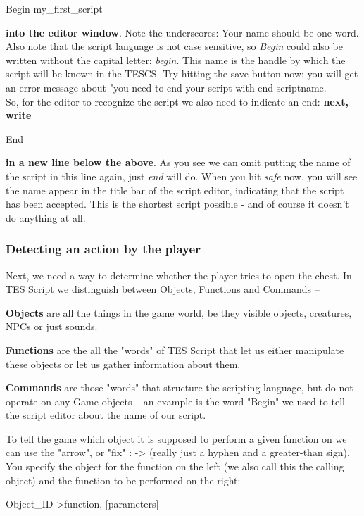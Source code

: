 \documentclass[
]{article}
\begin{document}
Begin my\_first\_script

\textbf{into the editor window}. Note the underscores: Your name should
be one word. Also note that the script language is not case sensitive,
so \emph{Begin} could also be written without the capital letter:
\emph{begin}. This name is the handle by which the script will be known
in the TESCS. Try hitting the save button now: you will get an error
message about "you need to end your script with end scriptname.\\
So, for the editor to recognize the script we also need to indicate an
end: \textbf{next, write}

End

\textbf{in a new line below the above}. As you see we can omit putting
the name of the script in this line again, just \emph{end} will do. When
you hit \emph{safe} now, you will see the name appear in the title bar
of the script editor, indicating that the script has been accepted. This
is the shortest script possible - and of course it doesn't do anything
at all.

\hypertarget{detecting-an-action-by-the-player}{%
\subsubsection{Detecting an action by the
player}\label{detecting-an-action-by-the-player}}

Next, we need a way to determine whether the player tries to open the
chest. In TES Script we distinguish between Objects, Functions and
Commands --

\textbf{Objects} are all the things in the game world, be they visible
objects, creatures, NPCs or just sounds.

\textbf{Functions} are the all the "words" of TES Script that let us
either manipulate these objects or let us gather information about them.

\textbf{Commands} are those "words" that structure the scripting
language, but do not operate on any Game objects -- an example is the
word "Begin" we used to tell the script editor about the name of our
script.

To tell the game which object it is supposed to perform a given function
on we can use the "arrow", or "fix" : -\textgreater{} (really just a
hyphen and a greater-than sign). You specify the object for the function
on the left (we also call this the calling object) and the function to
be performed on the right:

Object\_ID-\textgreater function, {[}parameters{]}
\end{document}
